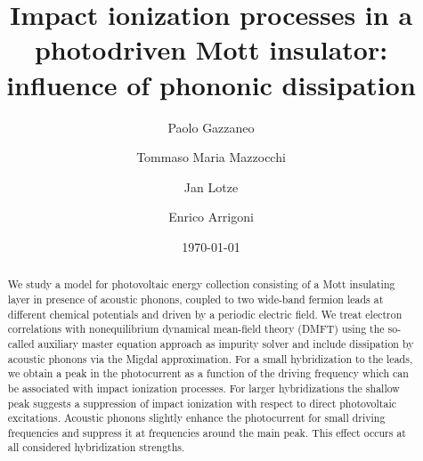 \documentclass[aps,prb,groupedaddress,showpacs,twocolumn,superscriptaddress,10pt]{revtex4-2}
\begin{document}
\title{Impact ionization processes in a photodriven Mott insulator: influence of phononic dissipation} 

\author{Paolo Gazzaneo}
\author{Tommaso Maria Mazzocchi}
\author{Jan Lotze}
\author{Enrico Arrigoni}

\date{\today}
 
\begin{abstract}    
 
We study a model for photovoltaic energy collection consisting of a Mott insulating layer in presence of acoustic phonons, coupled to two wide-band fermion leads at different chemical potentials and driven by a periodic electric field. We treat electron correlations with nonequilibrium dynamical mean-field theory (DMFT) using the so-called auxiliary master equation approach as impurity solver and include dissipation by acoustic phonons via the Migdal approximation. For a small hybridization to the leads, we obtain a peak in the photocurrent as a function of the driving frequency which can be associated with impact ionization processes.
For larger hybridizations the shallow peak suggests a suppression of impact ionization with respect to direct photovoltaic excitations. Acoustic phonons slightly enhance the photocurrent for small driving frequencies and suppress it at frequencies around the main peak. This effect occurs at all considered hybridization strengths.

\end{abstract}

       
\end{document}
